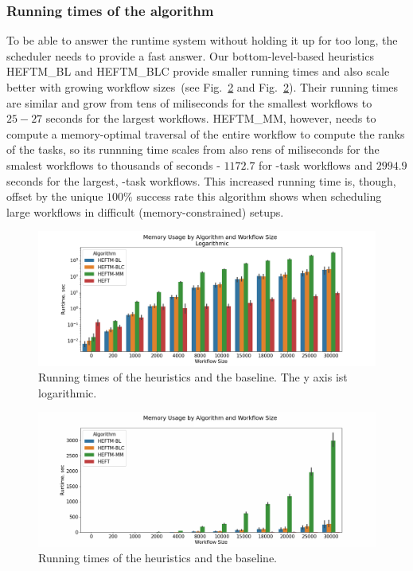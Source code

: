 \documentclass[conference]{IEEEtran}
\newcommand{\algo}[1]{\textsc{#1}}
\newcommand{\heftmm}{\algo{HEFTM\_MM}\xspace}
\newcommand{\heftbl}{\algo{HEFTM\_BL}\xspace}
\newcommand{\heftblc}{\algo{HEFTM\_BLC}\xspace}
\begin{document}
    \subsubsection{Running times of the algorithm}
    To be able to answer the runtime system without holding it up for too long, the scheduler needs to provide a fast answer.
    Our bottom-level-based heuristics \heftbl and \heftblc provide smaller running times and also scale better with growing workflow
    sizes~(see Fig.~\ref{fig:runtimes-abs} and Fig.~\ref{fig:runtimes-abs}).
    Their running times are similar and grow from tens of miliseconds for the smallest workflows to $25-27$ seconds for the largest workflows.
    \heftmm, however, needs to compute a memory-optimal traversal of the entire workflow to compute the ranks of the tasks,
    so its runnning time scales from also rens of miliseconds for the smalest workflows to thousands of seconds - $1172.7$ for -task workflows and
    $2994.9$ seconds for the largest, -task workflows.
    This increased running time is, though, offset by the unique $100\%$ success rate this algorithm shows when scheduling large
    workflows in difficult (memory-constrained) setups.
    
    \begin{figure}[tb]
        \centering
        \includegraphics[width=1.1\columnwidth] {images/runtimes-logarithmic}
        \caption{Running times of the heuristics and the baseline. The y axis ist logarithmic.}
        \label{fig:runtimes-log}
        \vspace{-0.3cm}
    \end{figure}


    \begin{figure}[tb]
        \centering
        \includegraphics[width=1.1\columnwidth] {images/runtimes-absolute}
        \caption{Running times of the heuristics and the baseline.}
        \label{fig:runtimes-abs}
        \vspace{-0.3cm}
    \end{figure}
\end{document}
